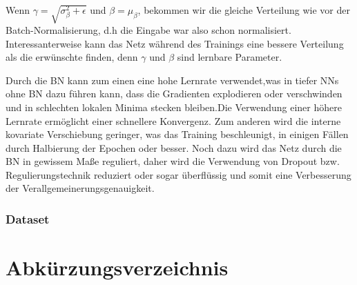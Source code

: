 \documentclass[12pt,a4paper]{scrartcl}
\numberwithin{equation}{section}
\begin{document}
Wenn $\gamma = \sqrt{\sigma_\beta^2 + \epsilon}$ und $\beta = \mu_\beta $, bekommen wir die gleiche Verteilung wie vor der Batch-Normalisierung, d.h die Eingabe war also schon normalisiert. Interessanterweise kann das Netz während des Trainings eine bessere Verteilung als die erwünschte finden, denn $\gamma$ und $\beta$ sind lernbare Parameter.

Durch die BN kann zum einen eine hohe Lernrate verwendet,was in tiefer \acsp{NN} ohne BN dazu führen kann, dass die Gradienten explodieren oder verschwinden und in schlechten lokalen Minima stecken bleiben.Die Verwendung einer höhere Lernrate ermöglicht einer schnellere Konvergenz.
Zum anderen wird die interne kovariate Verschiebung geringer, was das Training beschleunigt, in einigen Fällen durch Halbierung der Epochen oder besser. Noch dazu wird das Netz durch die BN in gewissem Maße reguliert, daher wird die Verwendung von Dropout bzw. Regulierungstechnik reduziert oder sogar überflüssig und somit eine Verbesserung der Verallgemeinerungsgenauigkeit.
\subsubsection{Dataset}
\section{Abkürzungsverzeichnis}
\begin{acronym}[THIBAUT]
\end{acronym}


\end{document}
